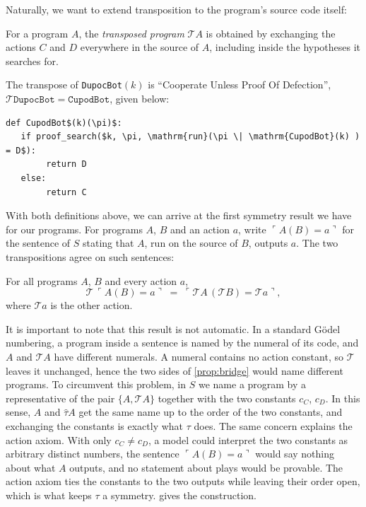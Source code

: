 \documentclass[twoside,11pt]{article}
\begin{document}
Naturally, we want to extend transposition to the program's source code itself:
\begin{definition}
    For a program $A$, the \emph{transposed program} $\mathcal{T}A$ is obtained by exchanging the actions $C$ and $D$ everywhere in the source of $A$, including inside the hypotheses it searches for.
\end{definition}
The transpose of \texttt{DupocBot}$(k)$ is \enquote{Cooperate Unless Proof Of Defection}, $\mathcal{T} \texttt{DupocBot} = \texttt{CupodBot}$, given below:
\begin{lstlisting}[style=pdcode, mathescape=true]
def CupodBot$(k)(\pi)$:
   if proof_search($k, \pi, \mathrm{run}(\pi \| \mathrm{CupodBot}(k) ) = D$):
        return D
   else:
        return C
\end{lstlisting}

With both definitions above, we can arrive at the first symmetry result we have for our programs. For programs $A$, $B$ and an action $a$, write $\ulcorner A(B) = a\urcorner$ for the sentence of $S$ stating that $A$, run on the source of $B$, outputs $a$. The two transpositions agree on such sentences:
\begin{theorem}\label{prop:bridge}
For all programs $A$, $B$ and every action $a$,
\[
  \mathcal{T}\,\ulcorner A(B) = a\urcorner \;=\; \ulcorner \mathcal{T} A\,(\mathcal{T} B) = \mathcal{T} a\urcorner ,
\]
where $\mathcal{T} a$ is the other action.
\end{theorem}
It is important to note that this result is not automatic. In a standard G\"odel numbering, a program inside a sentence is named by the numeral of its code, and $A$ and $\mathcal{T}A$ have different numerals. A numeral contains no action constant, so $\mathcal{T}$ leaves it unchanged, hence the two sides of \cref{prop:bridge} would name different programs. To circumvent this problem, in $S$ we name a program by a representative of the pair $\{A, \mathcal{T} A\}$ together with the two constants $c_C$, $c_D$. In this sense, $A$ and $\hat\tau A$ get the same name up to the order of the two constants, and exchanging the constants is exactly what $\tau$ does. The same concern explains the action axiom. With only $c_C \neq c_D$, a model could interpret the two constants as arbitrary distinct numbers, the sentence $\ulcorner A(B) = a\urcorner$ would say nothing about what $A$ outputs, and no statement about plays would be provable. The action axiom ties the constants to the two outputs while leaving their order open, which is what keeps $\tau$ a symmetry.  gives the construction.
\end{document}
